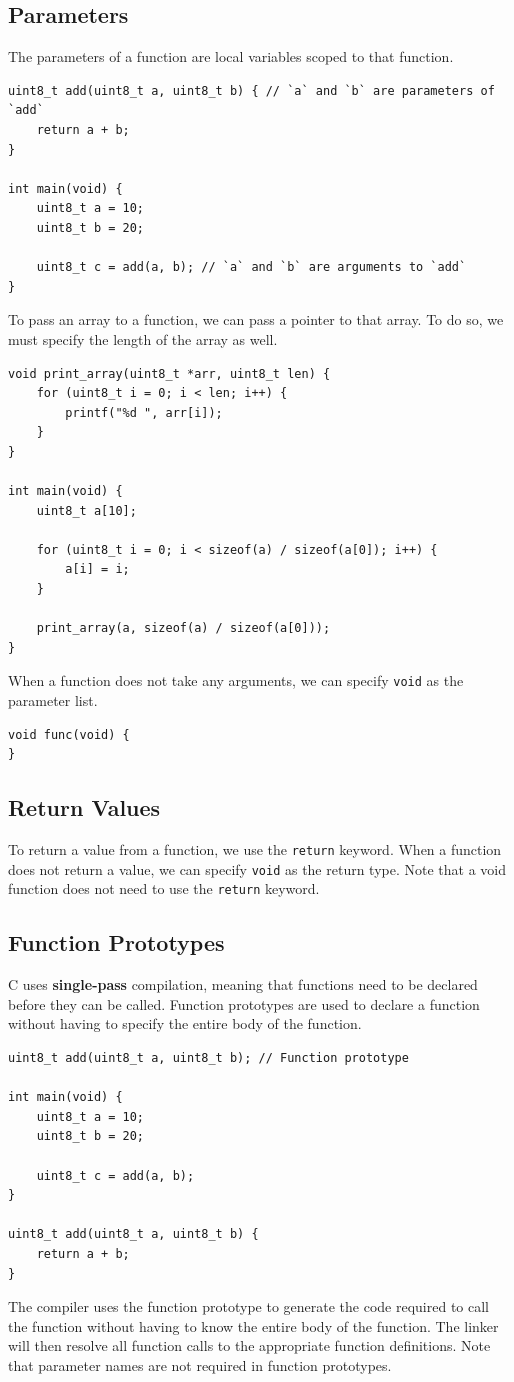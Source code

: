 \documentclass[a4paper]{report}
\begin{document}
\subsection{Parameters}
The parameters of a function are local variables scoped to that function.
\begin{verbatim}
uint8_t add(uint8_t a, uint8_t b) { // `a` and `b` are parameters of `add`
    return a + b;
}

int main(void) {
    uint8_t a = 10;
    uint8_t b = 20;

    uint8_t c = add(a, b); // `a` and `b` are arguments to `add`
}
\end{verbatim}
To pass an array to a function, we can pass a pointer to that array.
To do so, we must specify the length of the array as well.
\begin{verbatim}
void print_array(uint8_t *arr, uint8_t len) {
    for (uint8_t i = 0; i < len; i++) {
        printf("%d ", arr[i]);
    }
}

int main(void) {
    uint8_t a[10];

    for (uint8_t i = 0; i < sizeof(a) / sizeof(a[0]); i++) {
        a[i] = i;
    }

    print_array(a, sizeof(a) / sizeof(a[0]));
}
\end{verbatim}
When a function does not take any arguments, we can specify \texttt{void} as the parameter list.
\begin{verbatim}
void func(void) {
}
\end{verbatim}
\subsection{Return Values}
To return a value from a function, we use the \texttt{return} keyword.
When a function does not return a value, we can specify \texttt{void} as the return type.
Note that a void function does not need to use the \texttt{return} keyword.
\subsection{Function Prototypes}
C uses \textbf{single-pass} compilation, meaning that functions
need to be declared before they can be called.
Function prototypes are used to declare a function without having to specify the
entire body of the function.
\begin{verbatim}
uint8_t add(uint8_t a, uint8_t b); // Function prototype

int main(void) {
    uint8_t a = 10;
    uint8_t b = 20;

    uint8_t c = add(a, b);
}

uint8_t add(uint8_t a, uint8_t b) {
    return a + b;
}
\end{verbatim}
The compiler uses the function prototype to generate the code required
to call the function without having to know the entire body of the function.
The linker will then resolve all function calls to the appropriate function
definitions. Note that parameter names are not required in function prototypes.
\end{document}
